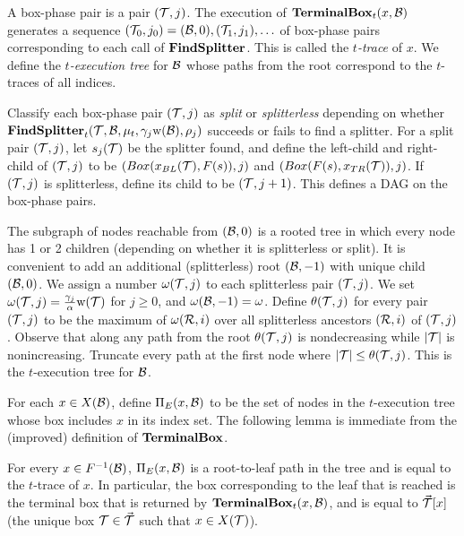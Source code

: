 \documentclass{acmsmall}
\newcommand{\cB}{{\cal B}}
\newcommand{\cR}{{\cal R}}
\newcommand{\cT}{{\cal T}}
\newcommand{\bx}{Box}
\newcommand{\terminalbox}{{\rm{\bf TerminalBox}}}
\newcommand{\width}{{\bf {\rm  w}}}
\newcommand{\gridprec}{\alpha}
\newcommand{\findsplitter}{{\rm {\bf FindSplitter}}}
\begin{document}
A box-phase pair is a pair $(\cT,j)$.  The execution of $\terminalbox_t(x,\cB)$ generates a sequence $(\cT_0,j_0)=(\cB,0),(\cT_1,j_1),\ldots$
of box-phase pairs corresponding to each call of $\findsplitter$.
This is called the {\em $t$-trace} of $x$.  We define the {\em $t$-execution tree} for $\cB$
whose paths from the root correspond to the $t$-traces of all indices.

Classify each box-phase pair $(\cT,j)$ as {\em split} or {\em splitterless} depending on whether \linebreak
$\findsplitter_t(\cT,\cB,\mu_t,\gamma_j \width(\cB),\rho_j)$ 
succeeds or fails  to find a splitter.  For a split pair $(\cT,j)$, let $s_j(\cT)$ be the splitter found, 
and define the left-child and right-child of $(\cT,j)$ to  be  $(\bx(x_{BL}(\cT),F(s)),j)$ and $(\bx(F(s),x_{TR}(\cT)),j)$.  
If $(\cT,j)$ is splitterless, define its child to be $(\cT,j+1)$.   This defines a DAG on the box-phase pairs.

The subgraph of nodes reachable from $(\cB,0)$ is a rooted tree in which every node has 1 or 2 children (depending on whether
it is splitterless or split).  It is convenient to add an additional (splitterless) root $(\cB,-1)$ with unique child $(\cB,0)$.
We assign a number $\omega(\cT,j)$ to each splitterless pair $(\cT,j)$. We set $\omega(\cT,j)=\frac{\gamma_j}{\gridprec}\width(\cT)$ for $j \geq 0$,
and $\omega(\cB,-1)=\omega$.
Define $\theta(\cT,j)$ for every pair $(\cT,j)$ to be the maximum of $\omega(\cR,i)$
over all splitterless ancestors $(\cR,i)$ of $(\cT,j)$.  Observe that along any path from the root 
$\theta(\cT,j)$ is nondecreasing  
while $|\cT|$ is nonincreasing.  Truncate every path at the first node where
$|\cT| \leq \theta(\cT,j)$.   This is the $t$-execution tree for $\cB$.


For each $x \in X(\cB)$, define
$\Pi_E(x,\cB)$ to be the set of nodes in the $t$-execution tree whose box includes $x$ in its index set.
The following lemma is immediate from the (improved) definition of  $\terminalbox$.


\begin{lemma}
\label{lem:execution}
For every $x \in F^{-1}(\cB)$, $\Pi_E(x,\cB)$ 
is a root-to-leaf path in the tree and is equal to the $t$-trace
of $x$.  In particular, the box corresponding to the leaf that is reached is the terminal box that is returned
by $\terminalbox_t(x,\cB)$, and is equal to
$\vec{\cT}[x]$ (the unique box $\cT \in \vec{\cT}$ such that $x \in X(\cT)$).
\end{lemma}
\end{document}
